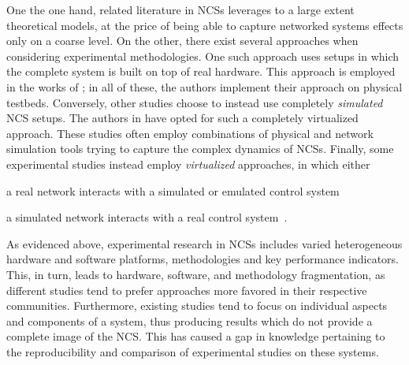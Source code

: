 One the one hand, related literature in \acp{NCS} leverages to a large extent theoretical models, at the price of being able to capture networked systems effects only on a coarse level. 
On the other, there exist several approaches when considering experimental methodologies. 
One such approach uses setups in which the complete system is built on top of real hardware.
This approach is employed in the works of  \textcite{Baumann2018LowPower,Cuenca2019UAV}; in all of these, the authors implement their approach on physical testbeds.
Conversely, other studies choose to instead use completely \emph{simulated} \ac{NCS} setups. The authors in \cite{Ma2019DynamicSched} have opted for such a completely virtualized approach. These studies often employ combinations of physical and network simulation tools trying to capture the complex dynamics of \acp{NCS}.
Finally, some experimental studies instead employ \emph{virtualized} approaches, in which either
\begin{enumerate*}[itemjoin={{; }}, itemjoin*={{; or }}]
    \item a real network interacts with a simulated or emulated control system~\cite{Wang2020VoltageControl}
    \item a simulated network interacts with a real control system~\cite{Natale2004InvPendEthernet}.
\end{enumerate*}

As evidenced above, experimental research in \acp{NCS} includes varied heterogeneous hardware and software platforms, methodologies and key performance indicators.
This, in turn, leads to hardware, software, and methodology fragmentation, as different studies tend to prefer approaches more favored in their respective communities.
Furthermore, existing studies tend to focus on individual aspects and components of a system, thus producing results which do not provide a complete image of the \ac{NCS}.
This has caused a gap in knowledge pertaining to the reproducibility and comparison of experimental studies on these systems.

